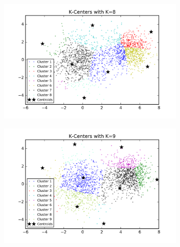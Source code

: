 \begin{figure}[htb]
\begin{subfigure}[b]{0.475\textwidth}
        \end{subfigure}
        \hfill
        \begin{subfigure}[b]{0.475\textwidth}  
            \centering 
            \includegraphics[width=\textwidth]{./figures/clustering_kCenter_8.png}
        \end{subfigure}
        \begin{subfigure}[b]{0.475\textwidth}   
            \centering 
            \includegraphics[width=\textwidth]{./figures/clustering_kCenter_9.png}
        \end{subfigure}
        \hfill
        \begin{subfigure}[b]{0.475\textwidth}   
            \centering 

\end{subfigure}
\end{figure}
